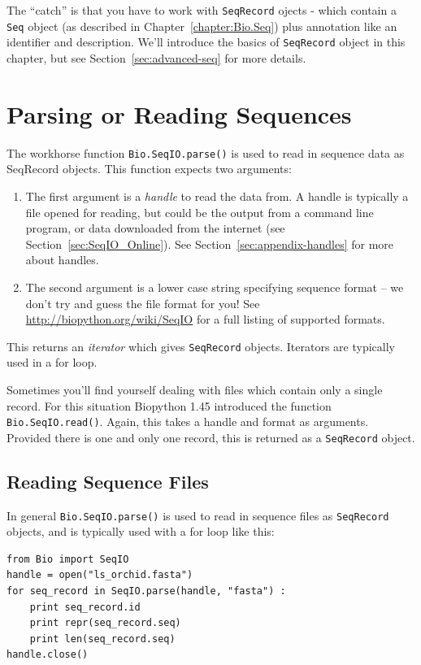 \documentclass{report}
\begin{document}
The ``catch'' is that you have to work with \verb|SeqRecord| ojects - which contain a \verb|Seq| object (as described in Chapter~\ref{chapter:Bio.Seq}) plus annotation like an identifier and description.  We'll introduce the basics of \verb|SeqRecord| object in this chapter, but see Section~\ref{sec:advanced-seq} for more details.

\section{Parsing or Reading Sequences}

The workhorse function \verb|Bio.SeqIO.parse()| is used to read in sequence data as SeqRecord objects.  This function expects two arguments:

\begin{enumerate}
\item The first argument is a {\it handle} to read the data from. A handle is typically a file opened for reading, but could be the output from a command line program, or data downloaded from the internet (see Section~\ref{sec:SeqIO_Online}).  See Section~\ref{sec:appendix-handles} for more about handles.
\item The second argument is a lower case string specifying sequence format -- we don't try and guess the file format for you!  See \url{http://biopython.org/wiki/SeqIO} for a full listing of supported formats.
\end{enumerate}

\noindent This returns an {\it iterator} which gives \verb|SeqRecord| objects.  Iterators are typically used in a for loop.

Sometimes you'll find yourself dealing with files which contain only a single record.  For this situation Biopython 1.45 introduced the function \verb|Bio.SeqIO.read()|.  Again, this takes a handle and format as arguments.  Provided there is one and only one record, this is returned as a \verb|SeqRecord| object.

\subsection{Reading Sequence Files}

In general \verb|Bio.SeqIO.parse()| is used to read in sequence files as \verb|SeqRecord| objects, and is typically used with a for loop like this:

\begin{verbatim}
from Bio import SeqIO
handle = open("ls_orchid.fasta")
for seq_record in SeqIO.parse(handle, "fasta") :
    print seq_record.id
    print repr(seq_record.seq)
    print len(seq_record.seq)
handle.close()
\end{verbatim}
\end{document}
